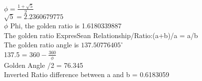 \documentclass{article} %
\begin{document}
$\phi = \frac{1 + \sqrt{5}}{2}$
\\ %
$\sqrt{5}=2.2360679775$
\\
\newcommand{\goldenratio}{1.6180339887}
$\phi$ Phi, the golden ratio is \goldenratio
\\
The golden ratio ExpresSean Relationship/Ratio:(a+b)/a = a/b
\\
The golden ratio angle is \ensuremath{137.50776405^\circ}
\\
    137.5 = $360 - \frac{360}{\phi}$
\\
Golden Angle /2 = 76.345
\\
Inverted Ratio difference between a and b = 0.6183059
\\
\end{document}
